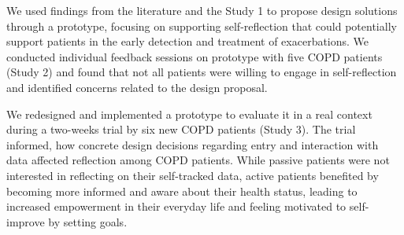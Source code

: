 We used findings from the literature and the Study 1 to propose design solutions through a prototype, focusing on supporting self-reflection that could potentially support patients in the early detection and treatment of exacerbations. We conducted individual feedback sessions on prototype with five COPD patients (Study 2) and found that not all patients were willing to engage in self-reflection and identified concerns related to the design proposal. 

We redesigned and implemented a prototype to evaluate it in a real context during a two-weeks trial by six new COPD patients (Study 3). The trial informed, how concrete design decisions regarding entry and interaction with data affected reflection among COPD patients. While passive patients were not interested in reflecting on their self-tracked data, active patients benefited by becoming more informed and aware about their health status, leading to increased empowerment in their everyday life and feeling motivated to self-improve by setting goals. 
